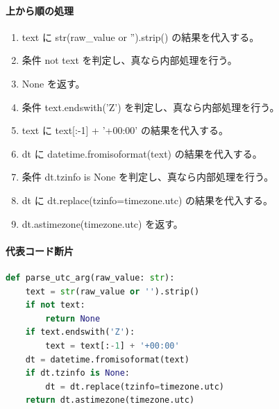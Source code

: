 \documentclass[a4paper,11pt]{article}
\begin{document}
            \paragraph{上から順の処理}
            \begin{enumerate}[leftmargin=1.8em]
            \item text に str(raw\_value or '').strip() の結果を代入する。
\item 条件 not text を判定し、真なら内部処理を行う。
\item   None を返す。
\item 条件 text.endswith('Z') を判定し、真なら内部処理を行う。
\item   text に text[:-1] + '+00:00' の結果を代入する。
\item dt に datetime.fromisoformat(text) の結果を代入する。
\item 条件 dt.tzinfo is None を判定し、真なら内部処理を行う。
\item   dt に dt.replace(tzinfo=timezone.utc) の結果を代入する。
\item dt.astimezone(timezone.utc) を返す。
            \end{enumerate}
            \paragraph{代表コード断片}
            \begin{lstlisting}[language=Python]
def parse_utc_arg(raw_value: str):
    text = str(raw_value or '').strip()
    if not text:
        return None
    if text.endswith('Z'):
        text = text[:-1] + '+00:00'
    dt = datetime.fromisoformat(text)
    if dt.tzinfo is None:
        dt = dt.replace(tzinfo=timezone.utc)
    return dt.astimezone(timezone.utc)
\end{lstlisting}
\end{document}
